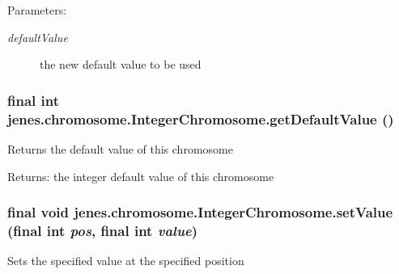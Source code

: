 \begin{Desc}
\item[Parameters:]
\begin{description}
\item[{\em defaultValue}]the new default value to be used \end{description}
\end{Desc}
\hypertarget{classjenes_1_1chromosome_1_1_integer_chromosome_ac608f3599a9289d510e0ee7bc34fbc9}{
\subsubsection[getDefaultValue]{\setlength{\rightskip}{0pt plus 5cm}final int jenes.chromosome.IntegerChromosome.getDefaultValue ()}}
\label{classjenes_1_1chromosome_1_1_integer_chromosome_ac608f3599a9289d510e0ee7bc34fbc9}


Returns the default value of this chromosome 

\begin{Desc}
\item[Returns:]the integer default value of this chromosome \end{Desc}
\hypertarget{classjenes_1_1chromosome_1_1_integer_chromosome_2d2aa7705d11a8ca21493c82bf334f74}{
\subsubsection[setValue]{\setlength{\rightskip}{0pt plus 5cm}final void jenes.chromosome.IntegerChromosome.setValue (final int {\em pos}, \/  final int {\em value})}}
\label{classjenes_1_1chromosome_1_1_integer_chromosome_2d2aa7705d11a8ca21493c82bf334f74}


Sets the specified value at the specified position 

